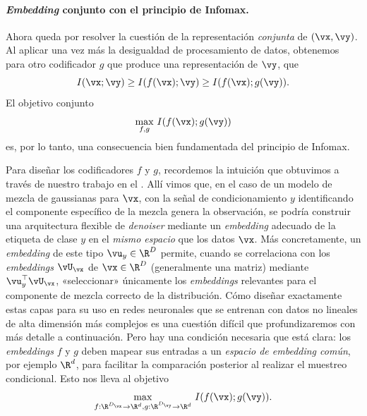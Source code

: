 \documentclass[../../book-main_es.tex]{subfiles}
\begin{document}
\paragraph{\textit{Embedding} conjunto con el principio de Infomax.}

Ahora queda por resolver la cuestión de la representación \textit{conjunta} de $(\vx, \vy)$.
Al aplicar una vez más la desigualdad de procesamiento de datos, obtenemos para otro codificador
$g$ que produce una representación de $\vy$, que
\begin{equation*}
    I(\vx; \vy) \geq I(f(\vx); \vy) \geq I(f(\vx); g(\vy)).
\end{equation*}
El objetivo conjunto
\begin{equation}\label{eq:infomax-x-y}
    \max_{f, g}\, I(f(\vx); g(\vy))
\end{equation}
es, por lo tanto, una consecuencia bien fundamentada del principio de Infomax.

Para diseñar los codificadores $f$ y $g$, recordemos la intuición que obtuvimos
a través de nuestro trabajo en el
. Allí vimos
que, en el caso de un modelo de mezcla de gaussianas para $\vx$, con la
señal de condicionamiento $y$ identificando el componente específico de la mezcla genera
la observación, se podría construir una arquitectura flexible de \textit{denoiser} mediante
un \textit{embedding} adecuado de la etiqueta de clase $y$ en el \textit{mismo espacio} que los
datos $\vx$.
Más concretamente, un \textit{embedding} de este tipo $\vu_y \in \R^D$ permite, cuando se correlaciona
con los \textit{embeddings} $\vU_{\vx}$ de $\vx \in \R^D$ (generalmente una
matriz) mediante $\vu_y^\top
\vU_{\vx}$, «seleccionar» únicamente los \textit{embeddings} relevantes para el componente de mezcla
correcto de la distribución.
Cómo diseñar exactamente estas capas para su uso en redes neuronales que se entrenan con
datos no lineales de alta dimensión
más complejos es una cuestión difícil
que profundizaremos con
más detalle a continuación. Pero hay una condición necesaria que está clara: los \textit{embeddings}
$f$ y $g$ deben mapear sus entradas a un \textit{espacio de \textit{embedding} común}, por ejemplo
$\R^d$, para facilitar la comparación posterior al realizar el muestreo
condicional.
Esto nos lleva al objetivo
\begin{equation}\label{eq:infomax-joint}
    \max_{f : \R^{D_{\vx}} \to \R^{d}, g: \R^{D_{\vy}} \to \R^d}\,
    I(f(\vx); g(\vy)).
\end{equation}
\end{document}
